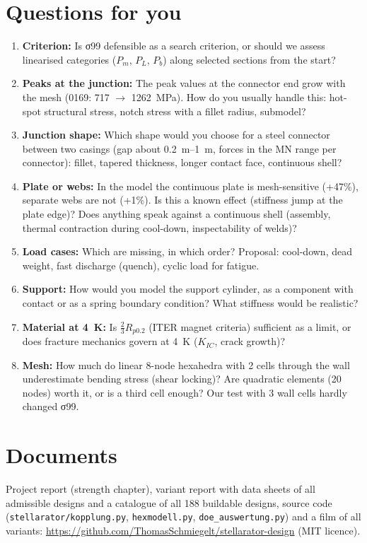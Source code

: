 \documentclass[10pt,a4paper]{article}
\begin{document}
\section{Questions for you}\label{sec:fragen}
\begin{enumerate}[itemsep=3pt]
\item \textbf{Criterion:} Is σ99 defensible as a search criterion, or should we assess linearised categories ($P_m$,
$P_L$, $P_b$) along selected sections from the start?
\item \textbf{Peaks at the junction:} The peak values at the connector end grow with the mesh (0169: \SI{717}{}
$\to$ \SI{1262}{MPa}). How do you usually handle this: hot-spot structural stress, notch stress with a fillet
radius, submodel?
\item \textbf{Junction shape:} Which shape would you choose for a steel connector between two casings (gap about
\SIrange{0.2}{1}{m}, forces in the MN range per connector): fillet, tapered thickness, longer contact face,
continuous shell?
\item \textbf{Plate or webs:} In the model the continuous plate is mesh-sensitive (+47\%), separate webs are not
(+1\%). Is this a known effect (stiffness jump at the plate edge)? Does anything speak against a continuous shell
(assembly, thermal contraction during cool-down, inspectability of welds)?
\item \textbf{Load cases:} Which are missing, in which order? Proposal: cool-down, dead weight, fast discharge
(quench), cyclic load for fatigue.
\item \textbf{Support:} How would you model the support cylinder, as a component with contact or as a spring boundary
condition? What stiffness would be realistic?
\item \textbf{Material at 4~K:} Is $\tfrac23R_{p0.2}$ (ITER magnet criteria) sufficient as a limit, or does fracture
mechanics govern at \SI{4}{K} ($K_{IC}$, crack growth)?
\item \textbf{Mesh:} How much do linear 8-node hexahedra with 2 cells through the wall underestimate bending stress
(shear locking)? Are quadratic elements (20 nodes) worth it, or is a third cell enough? Our test with 3 wall cells
hardly changed σ99.
\end{enumerate}

\section*{Documents}
Project report (strength chapter), variant report with data sheets of all admissible designs and a catalogue of all
188 buildable designs, source code (\texttt{stellarator/kopplung.py}, \texttt{hexmodell.py},
\texttt{doe\_auswertung.py}) and a film of all variants: \url{https://github.com/ThomasSchmiegelt/stellarator-design}
(MIT licence).
\end{document}
